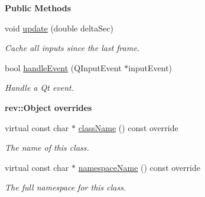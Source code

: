 \begin{Indent}\textbf{ Public Methods}\par
\begin{DoxyCompactItemize}
\item 
\mbox{\label{classrev_1_1_input_handler_aab80a8ccbdba8e58c62b325e78bebde9}} 
void \mbox{\hyperlink{classrev_1_1_input_handler_aab80a8ccbdba8e58c62b325e78bebde9}{update}} (double delta\+Sec)
\begin{DoxyCompactList}\small\item\em Cache all inputs since the last frame. \end{DoxyCompactList}\item 
bool \mbox{\hyperlink{classrev_1_1_input_handler_a0bff1861df9e2f54f8d22ef3b3344009}{handle\+Event}} (Q\+Input\+Event $\ast$input\+Event)
\begin{DoxyCompactList}\small\item\em Handle a Qt event. \end{DoxyCompactList}\end{DoxyCompactItemize}
\end{Indent}
\begin{Indent}\textbf{ rev\+::Object overrides}\par
\begin{DoxyCompactItemize}
\item 
virtual const char $\ast$ \mbox{\hyperlink{classrev_1_1_input_handler_a2837ab4ed7b6ce53f6aea9faa669021f}{class\+Name}} () const override
\begin{DoxyCompactList}\small\item\em The name of this class. \end{DoxyCompactList}\item 
virtual const char $\ast$ \mbox{\hyperlink{classrev_1_1_input_handler_a99cee0c8e7aff8670751090873ad494b}{namespace\+Name}} () const override
\begin{DoxyCompactList}\small\item\em The full namespace for this class. \end{DoxyCompactList}\end{DoxyCompactItemize}
\end{Indent}
